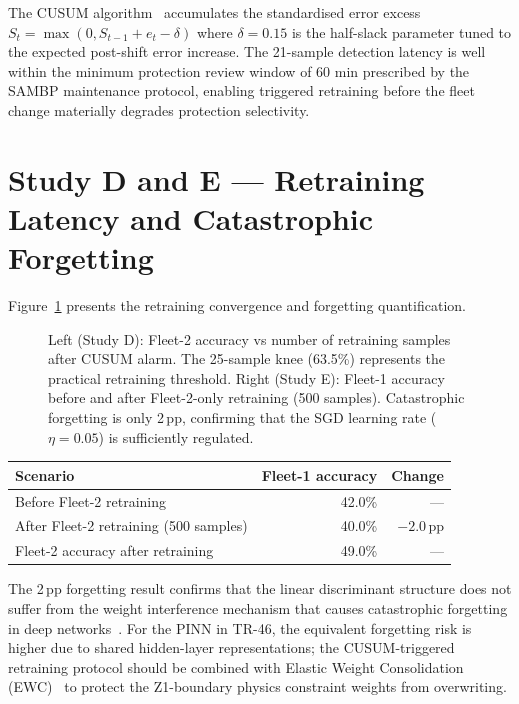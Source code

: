 \documentclass[11pt,a4paper]{article}
\begin{document}
\noindent
The CUSUM algorithm~\cite{Page1954} accumulates the standardised error excess
$S_t = \max(0, S_{t-1} + e_t - \delta)$ where $\delta=0.15$ is the
half-slack parameter tuned to the expected post-shift error increase.  The
21-sample detection latency is well within the minimum protection review
window of 60 min prescribed by the SAMBP maintenance protocol, enabling
triggered retraining before the fleet change materially degrades protection
selectivity.

\section{Study D and E --- Retraining Latency and Catastrophic Forgetting}
\label{sec:studyDE}

Figure~\ref{fig:retrain} presents the retraining convergence and forgetting
quantification.

\begin{figure}[htbp]
  \centering
  \resizebox{0.96\textwidth}{!}{}
  \caption{Left (Study D): Fleet-2 accuracy vs number of retraining samples
           after CUSUM alarm.  The 25-sample knee (63.5\%) represents the
           practical retraining threshold.  Right (Study E): Fleet-1
           accuracy before and after Fleet-2-only retraining (500 samples).
           Catastrophic forgetting is only 2\,pp, confirming that the
           SGD learning rate ($\eta=0.05$) is sufficiently regulated.}
  \label{fig:retrain}
\end{figure}

\begin{center}
\begin{tabular}{@{}lrr@{}}
\toprule
Scenario & Fleet-1 accuracy & Change \\
\midrule
Before Fleet-2 retraining & 42.0\% & --- \\
After Fleet-2 retraining (500 samples) & 40.0\% & $-2.0$\,pp \\
Fleet-2 accuracy after retraining & 49.0\% & --- \\
\bottomrule
\end{tabular}
\end{center}

\medskip\noindent
The 2\,pp forgetting result confirms that the linear discriminant structure
does not suffer from the weight interference mechanism that causes catastrophic
forgetting in deep networks~\cite{French1999,Kirkpatrick2017}.  For the PINN
in TR-46, the equivalent forgetting risk is higher due to shared hidden-layer
representations; the CUSUM-triggered retraining protocol should be combined
with Elastic Weight Consolidation (EWC)~\cite{Kirkpatrick2017} to protect
the Z1-boundary physics constraint weights from overwriting.
\end{document}
